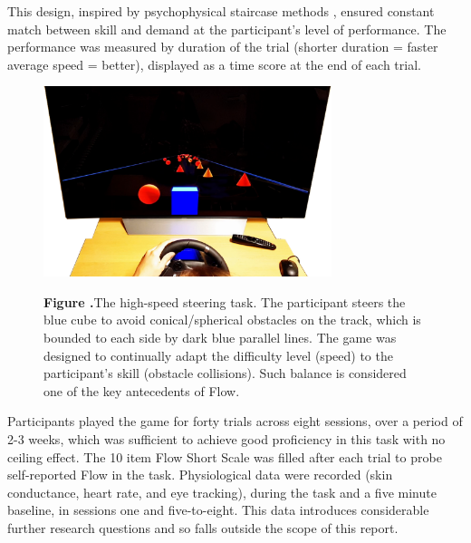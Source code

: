 \documentclass{frontierstyle/frontiersSCNS}
\newcommand{\nicewidth}{0.75\textwidth}
\begin{document}
This design, inspired by psychophysical staircase methods \citep{Cornsweet1962}, ensured constant match between skill and demand at the participant's level of performance. The performance was measured by duration of the trial (shorter duration = faster average speed = better), displayed as a time score at the end of each trial.

\begin{figure}[!ht]
\begin{center}
	\includegraphics[width=\nicewidth]{1_Screenshot_cogcarsim}
\end{center}
	\textbf{\label{fig:cogcarsim} Figure .}{The high-speed steering task. The participant steers the blue cube to avoid conical/spherical obstacles on the track, which is bounded to each side by dark blue parallel lines. The game was designed to continually adapt the difficulty level (speed) to the participant's skill (obstacle collisions). Such balance is considered one of the key antecedents of Flow.}
\end{figure}

Participants played the game for forty trials across eight sessions, over a period of 2-3 weeks, which was sufficient to achieve good proficiency in this task with no ceiling effect. The 10 item Flow Short Scale \citep{Engeser2008} was filled after each trial to probe self-reported Flow in the task. Physiological data were recorded (skin conductance, heart rate, and eye tracking), during the task and a five minute baseline, in sessions one and five-to-eight. This data introduces considerable further research questions and so falls outside the scope of this report.
\end{document}
